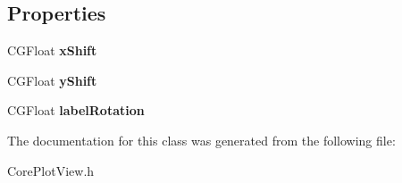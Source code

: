 \subsection*{Properties}
\begin{DoxyCompactItemize}
\item 
\hypertarget{interface_core_plot_view_adac431c1ed992111570f78c3348fd5d1}{
CGFloat {\bfseries xShift}}
\label{interface_core_plot_view_adac431c1ed992111570f78c3348fd5d1}

\item 
\hypertarget{interface_core_plot_view_a7fe5072fe01e8201ca056209db795641}{
CGFloat {\bfseries yShift}}
\label{interface_core_plot_view_a7fe5072fe01e8201ca056209db795641}

\item 
\hypertarget{interface_core_plot_view_a93d0fc39f8c5e1bace95670d81ed9922}{
CGFloat {\bfseries labelRotation}}
\label{interface_core_plot_view_a93d0fc39f8c5e1bace95670d81ed9922}

\end{DoxyCompactItemize}


The documentation for this class was generated from the following file:\begin{DoxyCompactItemize}
\item 
CorePlotView.h\end{DoxyCompactItemize}
